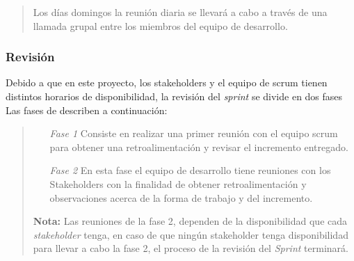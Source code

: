
    \begin{quote}
    Los días domingos la reunión diaria se llevará a cabo a través de una llamada grupal
    entre los miembros del equipo de desarrollo.
    \end{quote}

\subsubsection{Revisión}

 \noindent Debido a que en este proyecto, los stakeholders y el equipo de scrum
 tienen distintos horarios de disponibilidad, la revisión del {\it sprint} se divide
 en dos fases%
 Las fases de describen a continuación:

    \begin{quote}
    \begin{itemize}
    \item[\it Fase 1]
        Consiste en realizar una primer reunión con el equipo scrum para obtener una
        retroalimentación y revisar el incremento entregado.

    \item[\it Fase 2]
        En esta fase el equipo de desarrollo tiene reuniones con los Stakeholders con
        la finalidad de obtener retroalimentación y observaciones acerca de la forma
        de trabajo y del incremento.


    \end{itemize}

    {\bf Nota:} Las reuniones de la fase 2, dependen de la disponibilidad que cada
                {\it stakeholder} tenga, en caso de que ningún stakeholder tenga
                disponibilidad para llevar a cabo la fase 2, el proceso de la
                revisión del {\it Sprint} terminará.
    \end{quote}

